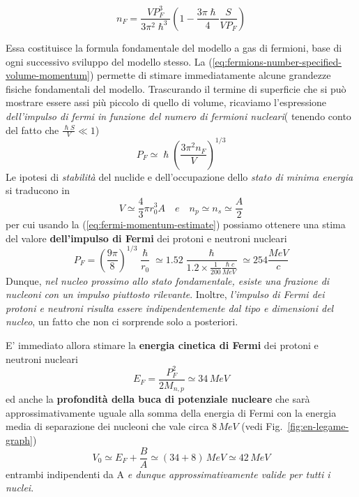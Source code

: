 \begin{equation}
	n_{F} = \frac{V P_{F}^{3}}{3 \pi^{2}\hslash^{3}} \left( 1 - \frac{3\pi \hslash}{4} \frac{S}{VP_{F}} \right)
	\label{eq:fermions-number-specified-volume-momentum}
\end{equation}

Essa costituisce la formula fondamentale del modello a gas di fermioni, base di ogni successivo sviluppo del modello stesso.
La (\ref{eq:fermions-number-specified-volume-momentum}) permette di stimare immediatamente alcune grandezze fisiche fondamentali del modello. Trascurando il termine di superficie che si può mostrare essere assi più piccolo di quello di volume, ricaviamo l’espressione \emph{dell’impulso di fermi in funzione del numero di fermioni nucleari}( tenendo conto del fatto che $\frac{\hslash S}{V} \ll 1$)
\begin{equation}
	P_{F} \simeq \hslash \left(\frac{3\pi^{2}n_{F}}{V} \right)^{1/3}
	\label{eq:fermi-momentum-estimate}
\end{equation}
Le ipotesi di \emph{stabilità} del nuclide e dell'occupazione dello \emph{stato di minima energia} si traducono in
\[
	V \simeq \frac{4}{3}\pi r_{0}^{3}A \quad e \quad n_{p}\simeq n_{s} \simeq \frac{A}{2}
\]
per cui usando la (\ref{eq:fermi-momentum-estimate}) possiamo ottenere una stima del valore \textbf{dell’impulso di Fermi} dei protoni e neutroni nucleari
\[
P_{F} = \left( \frac{9\pi}{8} \right)^{1/3} \frac{\hslash}{r_{0}} \simeq 1.52 \frac{\hslash}{1.2 \times \frac{1}{200}\frac{\hslash c}{MeV}} \simeq 254 \frac{MeV}{c}
\]
Dunque, \emph{nel nucleo prossimo allo stato fondamentale, esiste una frazione di nucleoni con un impulso piuttosto rilevante}. Inoltre, \emph{l’impulso di Fermi dei protoni e neutroni risulta essere indipendentemente dal tipo e dimensioni del nucleo}, un fatto che non ci sorprende solo a posteriori.
\bigskip

E’ immediato allora stimare la \textbf{energia cinetica di Fermi} dei protoni e neutroni nucleari
\begin{equation}
	E_{F} = \frac{P_{F}^{2}}{2M_{n,p}} \simeq 34 \, MeV
	\label{eq:fermi-kinetic-energy-estimate}
\end{equation}
ed anche la \textbf{profondità della buca di potenziale nucleare} che sarà approssimativamente uguale alla somma della energia di Fermi con la energia media di separazione dei nucleoni che vale circa $8 \, MeV$
(vedi Fig.~\ref{fig:en-legame-graph})
\begin{equation}
	V_{0} \simeq E_{F} + \frac{B}{A} \simeq (34 + 8)\, MeV \simeq 42 \, MeV
   \label{eq:}
\end{equation}
entrambi indipendenti da A \emph{e dunque approssimativamente valide per tutti i nuclei}.

